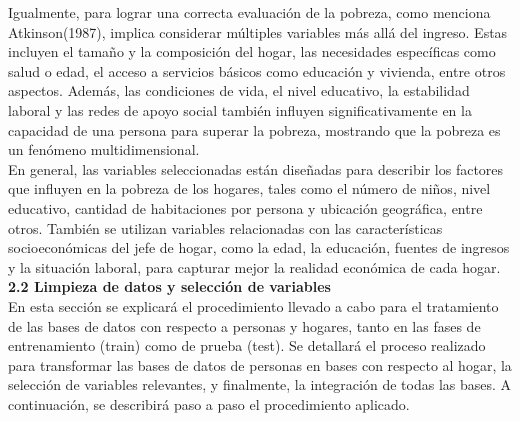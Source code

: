 \documentclass[a4paper]{article}
\theoremstyle{remark}
\theoremstyle{definition}
\begin{document}
Igualmente, para lograr una correcta evaluación de la pobreza, como menciona Atkinson(1987), implica considerar múltiples variables más allá del ingreso. Estas incluyen el tamaño y la composición del hogar, las necesidades específicas como salud o edad, el acceso a servicios básicos como educación y vivienda, entre otros aspectos. Además, las condiciones de vida, el nivel educativo, la estabilidad laboral y las redes de apoyo social también influyen significativamente en la capacidad de una persona para superar la pobreza, mostrando que la pobreza es un fenómeno multidimensional.\\

En general, las variables seleccionadas están diseñadas para describir los factores que influyen en la pobreza de los hogares, tales como el número de niños, nivel educativo, cantidad de habitaciones por persona y ubicación geográfica, entre otros. También se utilizan variables relacionadas con las características socioeconómicas del jefe de hogar, como la edad, la educación, fuentes de ingresos y la situación laboral, para capturar mejor la realidad económica de cada hogar.\\

\textbf{2.2 Limpieza de datos y selección de variables} \\

En esta sección se explicará el procedimiento llevado a cabo para el tratamiento de las bases de datos con respecto a personas y hogares, tanto en las fases de entrenamiento (train) como de prueba (test). Se detallará el proceso realizado para transformar las bases de datos de personas en bases con respecto al hogar, la selección de variables relevantes, y finalmente, la integración de todas las bases. A continuación, se describirá paso a paso el procedimiento aplicado.\\
\end{document}
